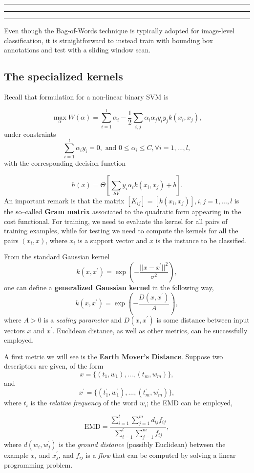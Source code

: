 \documentclass[10pt]{report}
\begin{document}
\vspace*{0.6cm}\hrule
\hrule
\hrule
\vspace*{0.4cm}

Even though the Bag\--of\--Words technique is typically adopted for image\--level classification, it is straightforward to instead train with bounding box annotations and test with a sliding window scan.

\subsection{The specialized kernels}
\label{sec:org78c39e9}
Recall that formulation for a non\--linear binary SVM is

\[\max_{\alpha} W(\alpha) = \sum_{i=1}^l \alpha_i - \frac 1 2 \sum_{i,j} \alpha_i \alpha_j y_i y_j k(x_i,x_j),\]
under constraints
\[\sum_{i=1}^l \alpha_i y_i = 0, \mbox{ and } 0 \leq \alpha_i \leq C, \forall i=1,\dots,l,\] with the corresponding decision function

$$h(x) = \Theta\left[\sum_{SV} y_i\alpha_i k(x_i, x_j) + b\right].$$ An
important remark is that the matrix \([K_{ij}] = [k(x_i, x_j)], i,j=1,\dots,l\) is
the so--called \textbf{Gram matrix} associated to the quadratic form appearing in the cost functional. For training, we need to evaluate the kernel for all pairs of training examples, while for testing we need to compute the kernels for all the pairs \((x_i, x)\), where \(x_i\) is a support vector and \(x\) is the instance to be classified.

From the standard Gaussian kernel $$k(x,x^\prime)= \exp{\left(-\frac{||x-x^\prime||^2}{\sigma^2}\right)},$$ one can define a \textbf{generalized Gaussian kernel} in the following way, $$k(x,x^\prime)= \exp{\left(-\frac{D(x, x^\prime)}{A}\right)},$$ where \(A > 0\) is  a \emph{scaling parameter} and \(D(x, x^\prime)\) is some distance between input vectors \(x\) and \(x^\prime\). Euclidean distance, as well as other metrics, can be successfully employed.

A first metric we will see is the \textbf{Earth Mover's Distance}. Suppose two descriptors are given, of the form
$$x = \{(t_1, w_1),\dots,(t_m,w_m)\},$$ and
$$x^\prime = \{(t^\prime_1, w^\prime_1),\dots,(t^\prime_m,w^\prime_m)\},$$ where \(t_i\) is the \emph{relative frequency} of the word \(w_i\); the EMD can be employed,

\[\mbox{EMD} = \frac{\sum_{i=1}^l \sum_{j=1}^m d_{ij}f_{ij}}{\sum_{i=1}^l \sum_{j=1}^m f_{ij}},\] where \(d(w_i, w_j^\prime)\) is the \emph{ground distance} (possibly Euclidean) between the example \(x_i\) and \(x_j^\prime\), and \(f_{ij}\) is a \emph{flow} that can be computed by solving a linear programming problem.
\end{document}

